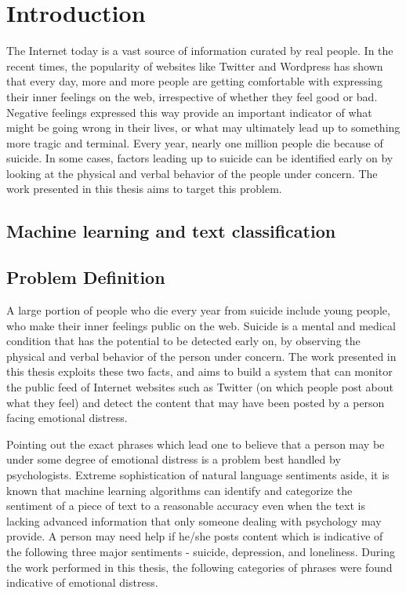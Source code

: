 \chapter{Introduction}
\label{chapter:Introduction}

The Internet today is a vast source of information curated by real people. In the recent times, the popularity of websites like Twitter and Wordpress has shown that every day, more and more people are getting comfortable with expressing their inner feelings on the web, irrespective of whether they feel good or bad. Negative feelings expressed this way provide an important indicator of what might be going wrong in their lives, or what may ultimately lead up to something more tragic and terminal. Every year, nearly one million people die because of suicide. In some cases, factors leading up to suicide can be identified early on by looking at the physical and verbal behavior of the people under concern. The work presented in this thesis aims to target this problem.

\section{Machine learning and text classification}

\section{Problem Definition}
A large portion of people who die every year from suicide include young people, who make their inner feelings public on the web. Suicide is a mental and medical condition that has the potential to be detected early on, by observing the physical and verbal behavior of the person under concern. The work presented in this thesis exploits these two facts, and aims to build a system that can monitor the public feed of Internet websites such as Twitter (on which people post about what they feel) and detect the content that may have been posted by a person facing emotional distress.

Pointing out the exact phrases which lead one to believe that a person may be under some degree of emotional distress is a problem best handled by psychologists. Extreme sophistication of natural language sentiments aside, it is known that machine learning algorithms can identify and categorize the sentiment of a piece of text to a reasonable accuracy even when the text is lacking advanced information that only someone dealing with psychology may provide. A person may need help if he/she posts content which is indicative of the following three major sentiments - suicide, depression, and loneliness. During the work performed in this thesis, the following categories of phrases were found indicative of emotional distress.

